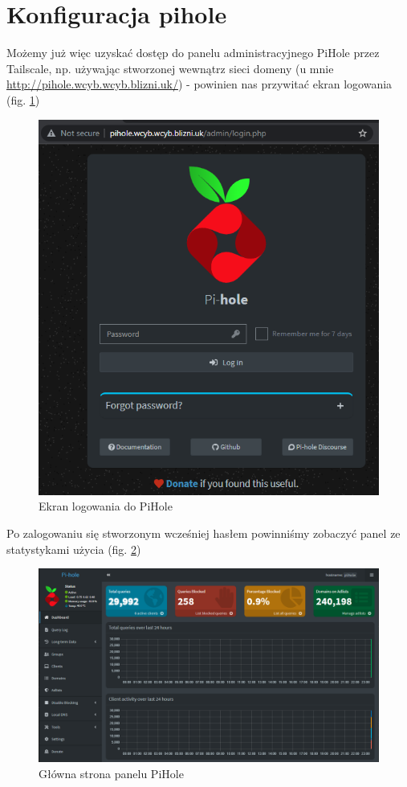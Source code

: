 \documentclass{report}
\numberwithin{equation}{section}
\begin{document}
\section{Konfiguracja pihole}
Możemy już więc uzyskać dostęp do panelu administracyjnego PiHole przez Tailscale, np. używając stworzonej wewnątrz sieci domeny (u mnie \url{http://pihole.wcyb.wcyb.blizni.uk/}) - powinien nas przywitać ekran logowania (fig. \ref{fig:pihole_login})
\begin{figure}[H]
    \centering
    \includegraphics[scale=0.75]{pihole-login.png}
    \caption{Ekran logowania do PiHole}
    \label{fig:pihole_login}
\end{figure}
Po zalogowaniu się stworzonym wcześniej hasłem powinniśmy zobaczyć panel ze statystykami użycia (fig. \ref{fig:pihole_dashboard})
\begin{figure}[H]
    \centering
    \includegraphics[scale=0.5]{pihole-dashboard.png}
    \caption{Główna strona panelu PiHole}
    \label{fig:pihole_dashboard}
\end{figure}
\end{document}
